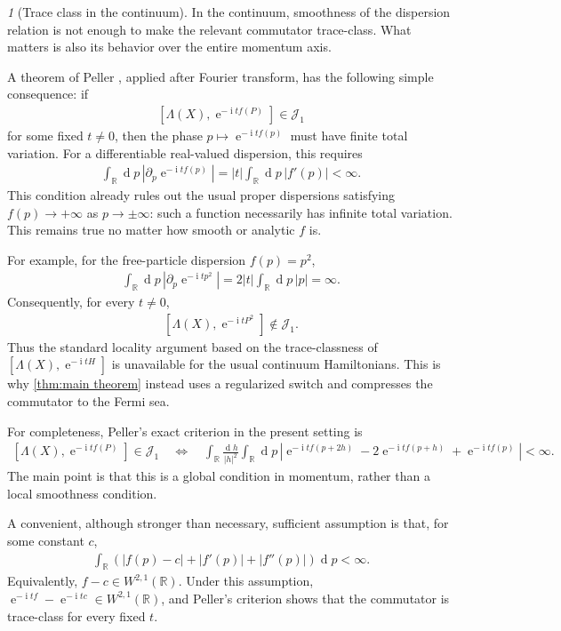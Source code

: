 \documentclass[a4paper,10pt]{article}
\numberwithin{equation}{section}
\theoremstyle{plain}
\theoremstyle{plain}
\theoremstyle{plain}
\theoremstyle{plain}
\theoremstyle{plain}
\theoremstyle{remark}
\newtheorem{rem}[thm]{\protect\remarkname}
\theoremstyle{definition}
\theoremstyle{plain}
\providecommand{\remarkname}{Remark}
\newcommand{\ee}{\operatorname{e}}
\newcommand{\ii}{\operatorname{i}}
\newcommand{\RR}{\mathbb{R}}
\newcommand{\calJ}{\mathcal{J}}
\newcommand{\dif}{\operatorname{d}\!} %
\newcommand{\eq}[1]{\begin{align*}#1\end{align*}}
\newcommand{\eql}[1]{\begin{align}#1\end{align}}
\begin{document}
\begin{rem}[Trace class in the continuum]
\label{rem:continuum trace class}
In the continuum, smoothness of the dispersion relation is not enough to
make the relevant commutator trace-class. What matters is also its behavior
over the entire momentum axis.

A theorem of Peller
\cite[Theorem~5.7]{Peller2024Besov}, applied after Fourier transform,
has the following simple consequence: if
\eq{
\left[\Lambda(X),\ee^{-\ii t f(P)}\right]\in\calJ_1
}
for some fixed $t\neq 0$, then the phase
$p\mapsto\ee^{-\ii t f(p)}$ must have finite total variation. For a
differentiable real-valued dispersion, this requires
\eq{
\int_{\RR}\dif{p}\,
\left|\partial_p\ee^{-\ii t f(p)}\right|
=
|t|\int_{\RR}\dif{p}\,|f'(p)|
<\infty.
}
This condition already rules out the usual proper dispersions satisfying
$f(p)\to+\infty$ as $p\to\pm\infty$: such a function necessarily has
infinite total variation. This remains true no matter how smooth or
analytic $f$ is.

For example, for the free-particle dispersion $f(p)=p^2$,
\eq{
\int_{\RR}\dif{p}\,
\left|\partial_p\ee^{-\ii t p^2}\right|
=
2|t|\int_{\RR}\dif{p}\,|p|
=
\infty.
}
Consequently, for every $t\neq 0$,
\eq{
\left[\Lambda(X),\ee^{-\ii tP^2}\right]\notin\calJ_1.
}
Thus the standard locality argument based on the trace-classness of
$\left[\Lambda(X),\ee^{-\ii tH}\right]$ is unavailable for the usual
continuum Hamiltonians. This is why \cref{thm:main theorem} instead uses
a regularized switch and compresses the commutator to the Fermi sea.

For completeness, Peller's exact criterion in the present setting is
\eql{
\left[\Lambda(X),\ee^{-\ii t f(P)}\right]\in\calJ_1
\quad\Longleftrightarrow\quad
\int_{\RR}\frac{\dif{h}}{|h|^2}
\int_{\RR}\dif{p}\,
\left|
\ee^{-\ii t f(p+2h)}
-2\ee^{-\ii t f(p+h)}
+\ee^{-\ii t f(p)}
\right|
<\infty.
\label{eq:Peller criterion}
}
The main point is that this is a global condition in momentum, rather
than a local smoothness condition.

A convenient, although stronger than necessary, sufficient assumption is
that, for some constant $c$,
\eq{
\int_{\RR}
\left(
|f(p)-c|+|f'(p)|+|f''(p)|
\right)\dif{p}
<\infty.
}
Equivalently, $f-c\in W^{2,1}(\RR)$. Under this assumption,
$\ee^{-\ii t f}-\ee^{-\ii t c}\in W^{2,1}(\RR)$, and Peller's criterion
shows that the commutator is trace-class for every fixed $t$.
\end{rem}
\end{document}

